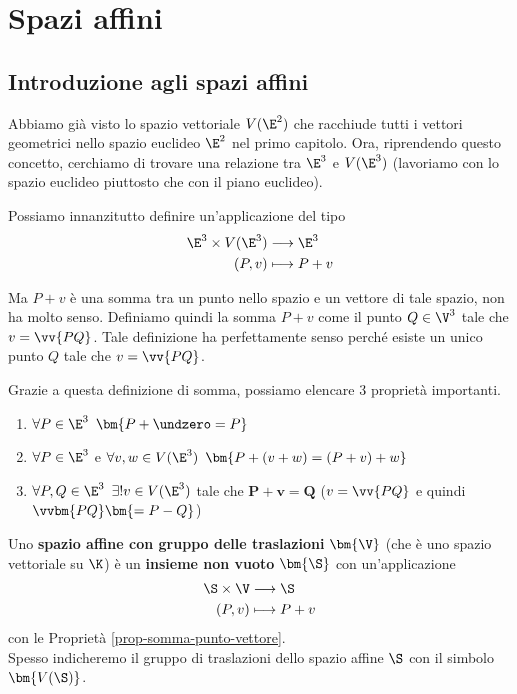 \documentclass[11pt, a4paper, titlepage, oneside]{scrbook}
\begin{document}
\chapter{Spazi affini}
\section{Introduzione agli spazi affini}

Abbiamo già visto lo spazio vettoriale $V(\E^2)$ che racchiude tutti i vettori geometrici nello spazio euclideo $\E^2$ nel primo capitolo. Ora, riprendendo questo concetto, cerchiamo di trovare una relazione tra $\E^3$ e $V(\E^3)$ (lavoriamo con lo spazio euclideo piuttosto che con il piano euclideo). 

Possiamo innanzitutto definire un'applicazione del tipo
\begin{align*}
\E^3 \times V(\E^3) &\longrightarrow \E^3 \\
(P, v) &\longmapsto P + v
\end{align*}

Ma $P + v$ è una somma tra un punto nello spazio e un vettore di tale spazio, non ha molto senso. Definiamo quindi la somma $P+v$ come il punto $Q \in \V^3$ tale che $v = \vv{PQ}$. Tale definizione ha perfettamente senso perché esiste un unico punto $Q$ tale che $v = \vv{PQ}$. 

Grazie a questa definizione di somma, possiamo elencare 3 proprietà importanti.

\begin{Proprieta}
\label{prop-somma-punto-vettore}
\begin{enumerate}
    \item $\forall P \in \E^3 \enspace \bm{P + \undzero = P}$
    \item $\forall P \in \E^3$ e $\forall v,w \in V(\E^3) \enspace \bm{P + (v+w) = (P+v) + w}$
    \item $\forall P,Q \in \E^3 \enspace \exists ! v \in V(\E^3)$ tale che $\bm{P + v = Q}$ ($v = \vv{PQ}$ e quindi $\vvbm{PQ} \bm{= P - Q}$) 
\end{enumerate}
\end{Proprieta}

\begin{Definizione}
\label{def-spazio-affine}
Uno \textbf{spazio affine con gruppo delle traslazioni} $\bm{\V}$ (che è uno spazio vettoriale su $\K$) è un \textbf{insieme non vuoto} $\bm{\S}$ con un'applicazione
\begin{align*}
\S \times \V &\longrightarrow \S \\
(P,v) &\longmapsto P + v
\end{align*}
con le Proprietà \ref{prop-somma-punto-vettore}. \\
\NB Spesso indicheremo il gruppo di traslazioni dello spazio affine $\S$ con il simbolo $\bm{V(\S)}$.
\end{Definizione}
\end{document}
